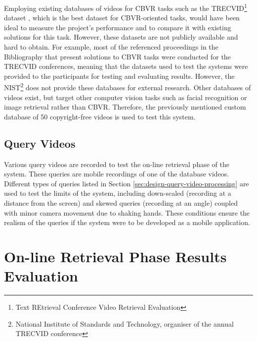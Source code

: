 Employing existing databases of videos for CBVR tasks such as the TRECVID\footnote{Text REtrieval Conference Video Retrieval Evaluation} dataset \cite{2018trecvidawad}, which is the best dataset for CBVR-oriented tasks, would have been ideal to measure the project's performance and to compare it with existing solutions for this task. However, these datasets are not publicly available and hard to obtain. For example, most of the referenced proceedings in the Bibliography that present solutions to CBVR tasks were conducted for the TRECVID conferences, meaning that the datasets used to test the systems were provided to the participants for testing and evaluating results. However, the NIST\footnote{National Institute of Standards and Technology, organiser of the annual TRECVID conference} does not provide these databases for external research. Other databases of videos exist, but target other computer vision tasks such as facial recognition or image retrieval rather than CBVR. Therefore, the previously mentioned custom database of 50 copyright-free videos is used to test this system.


\subsection{Query Videos}

Various query videos are recorded to test the on-line retrieval phase of the system. These queries are mobile recordings of one of the database videos. Different types of queries listed in Section \ref{sec:design-query-video-processing} are used to test the limits of the system, including down-scaled (recording at a distance from the screen) and skewed queries (recording at an angle) coupled with minor camera movement due to shaking hands. These conditions ensure the realism of the queries if the system were to be developed as a mobile application.\\


\section{On-line Retrieval Phase Results Evaluation}

